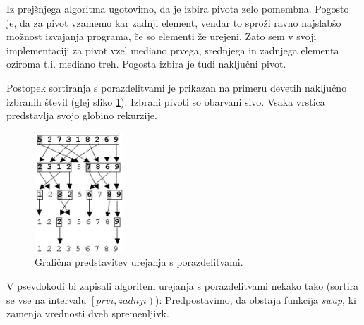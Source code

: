 \documentclass[a4paper,oneside]{article}
\begin{document}
Iz prejšnjega algoritma ugotovimo, da je izbira pivota zelo
pomembna. Pogosto je, da za pivot vzamemo kar zadnji element, vendar to sproži ravno
najslabšo možnost izvajanja programa, če so elementi že urejeni. Zato sem v svoji
implementaciji za pivot vzel mediano prvega, srednjega in zadnjega elementa oziroma t.i.
mediano treh. Pogosta izbira je tudi naključni pivot. 

Postopek sortiranja s porazdelitvami je prikazan na primeru devetih naključno
izbranih števil (glej sliko \ref{fig:quicksortimage}). Izbrani pivoti so obarvani sivo.
Vsaka vrstica predstavlja svojo globino rekurzije.


\begin{figure}[h]
    \begin{center}
        \includegraphics[height=45mm]{slike/quicksort.jpg}
    \end{center}
    \vspace{-0.7cm}
    \caption{Grafična predstavitev urejanja s porazdelitvami.}
    \label{fig:quicksortimage}
\end{figure}

V psevdokodi bi zapisali algoritem urejanja s porazdelitvami
nekako tako (sortira se vse na intervalu
$\left[prvi, zadnji\right)$):
Predpostavimo, da obstaja funkcija \emph{swap}, ki zamenja vrednosti dveh spremenljivk.
\end{document}
